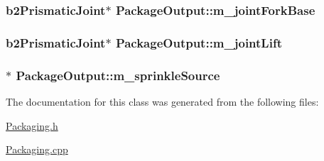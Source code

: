 \hypertarget{classPackageOutput_a13c8e517356d405fcc3761dbf5297243}{
\subsubsection[{m\-\_\-joint\-Fork\-Base}]{\setlength{\rightskip}{0pt plus 5cm}b2\-Prismatic\-Joint$\ast$ Package\-Output\-::m\-\_\-joint\-Fork\-Base}}\label{classPackageOutput_a13c8e517356d405fcc3761dbf5297243}
\hypertarget{classPackageOutput_a10725b3931a327ca8cad5527d65dadc5}{
\subsubsection[{m\-\_\-joint\-Lift}]{\setlength{\rightskip}{0pt plus 5cm}b2\-Prismatic\-Joint$\ast$ Package\-Output\-::m\-\_\-joint\-Lift}}\label{classPackageOutput_a10725b3931a327ca8cad5527d65dadc5}
\hypertarget{classPackageOutput_a920a0cd21450d4c9e0330e72064970ac}{
\subsubsection[{m\-\_\-sprinkle\-Source}]{$\ast$ Package\-Output\-::m\-\_\-sprinkle\-Source}}\label{classPackageOutput_a920a0cd21450d4c9e0330e72064970ac}


The documentation for this class was generated from the following files\-:\begin{DoxyCompactItemize}
\item 
\hyperlink{Packaging_8h}{Packaging.\-h}\item 
\hyperlink{Packaging_8cpp}{Packaging.\-cpp}\end{DoxyCompactItemize}
